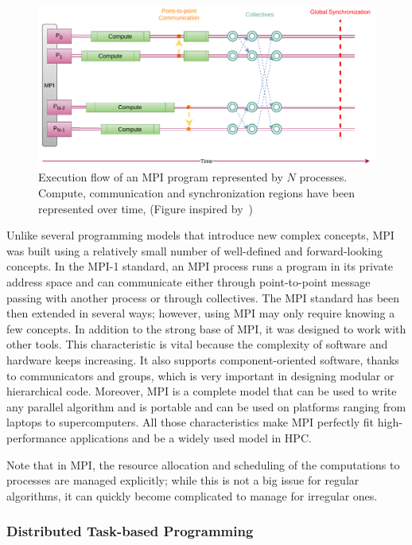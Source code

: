 \begin{figure}[h!]\centering
\includegraphics[scale=0.9]{figures/MPI.pdf}
\caption{Execution flow of an MPI program represented by $N$ processes. Compute, communication and synchronization regions have been represented over time, (Figure inspired by~\cite{mpi_report})}
\label{figmpi}
\end{figure}

Unlike several programming models that introduce new complex concepts, MPI was built using a relatively small number of well-defined and forward-looking concepts\cite{traff_recent_2012}. In the MPI-1 standard, an MPI process runs a program in its private address space and can communicate either through point-to-point message passing with another process or through collectives. 
The MPI standard has been then extended in several ways; however, using MPI may only require knowing a few concepts.
In addition to the strong base of MPI, it was designed to work with other tools. This characteristic is vital because the complexity of software and hardware keeps increasing. It also supports component-oriented software, thanks to communicators and groups, which is very important in designing modular or hierarchical code. Moreover, MPI is a complete model that can be used to write any parallel algorithm and is portable and can be used on platforms ranging from laptops to supercomputers\cite{goos_learning_2001}. All those characteristics make MPI perfectly fit high-performance applications and be a widely used model in HPC.

Note that in MPI, the resource allocation and scheduling of the computations to processes are managed explicitly; while this is not a big issue for regular algorithms, it can quickly become complicated to manage for irregular ones.


\subsubsection{Distributed Task-based Programming}\label{sec:taskbased}

